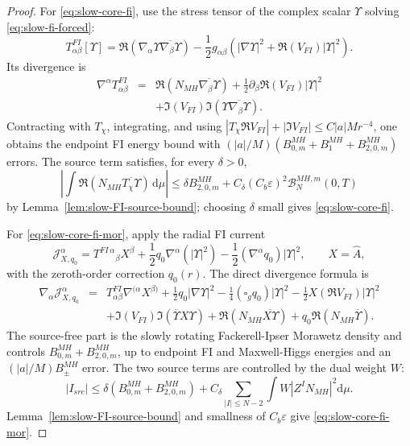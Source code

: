 \documentclass[10pt,a4paper]{amsart}
\newcommand{\dd}{\mathrm{d}}
\begin{document}
\begin{proof}
For \eqref{eq:slow-core-fi}, use the stress tensor of the complex scalar \(\Upsilon\) solving \eqref{eq:slow-fi-forced}:
\begin{equation}
T^{FI}_{\alpha\beta}[\Upsilon]
=\Re(\nabla_\alpha\Upsilon\overline{\nabla_\beta\Upsilon})
-\frac12g_{\alpha\beta}\left(|\nabla\Upsilon|^2+\Re(V_{FI})|\Upsilon|^2\right).
\end{equation}
Its divergence is
\begin{eqnarray}
\nabla^\alpha T^{FI}_{\alpha\beta}
&=&
\Re(N_{MH}\overline{\nabla_\beta\Upsilon})
+\frac12\partial_\beta\Re(V_{FI})|\Upsilon|^2
\nonumber\\
&&+\Im(V_{FI})\Im(\Upsilon\overline{\nabla_\beta\Upsilon}).
\end{eqnarray}
Contracting with \(T_\chi\), integrating, and using \(|T_\chi\Re V_{FI}|+|\Im V_{FI}|\le C|a|Mr^{-4}\), one obtains the endpoint FI energy bound with \((|a|/M)(B_{0,m}^{MH}+B_1^{MH}+B_{2,0,m}^{MH})\) errors.  The source term satisfies, for every \(\delta>0\),
\begin{equation}
\left|\int \Re(N_{MH}\overline{T_\chi\Upsilon})\,\dd\mu\right|
\le \delta B_{2,0,m}^{MH}
+C_\delta(C_b\varepsilon)^2\mathcal B_N^{MH,m}(0,T)
\end{equation}
by Lemma~\ref{lem:slow-FI-source-bound}; choosing \(\delta\) small gives \eqref{eq:slow-core-fi}.

For \eqref{eq:slow-core-fi-mor}, apply the radial FI current
\begin{equation}
\mathcal J^\alpha_{X,q_0}
=T^{FI\,\alpha}{}_{\beta}X^\beta
+\frac12q_0\nabla^\alpha(|\Upsilon|^2)
-\frac12(\nabla^\alpha q_0)|\Upsilon|^2,
\qquad X=\widehat A,
\end{equation}
with the zeroth-order correction \(q_0(r)\).  The direct divergence formula is
\begin{eqnarray}
\nabla_\alpha\mathcal J^\alpha_{X,q_0}
&=&T^{FI}_{\alpha\beta}\nabla^{(\alpha}X^{\beta)}
+\frac12q_0|\nabla\Upsilon|^2
-\frac14(\square_gq_0)|\Upsilon|^2
-\frac12X(\Re V_{FI})|\Upsilon|^2
\nonumber\\
&&+\Im(V_{FI})\Im(\overline\Upsilon X\Upsilon)
+\Re(N_{MH}\overline{X\Upsilon})
+q_0\Re(N_{MH}\overline\Upsilon).
\end{eqnarray}
The source-free part is the slowly rotating Fackerell-Ipser Morawetz density and controls \(B_{0,m}^{MH}+B_{2,0,m}^{MH}\), up to endpoint FI and Maxwell-Higgs energies and an \((|a|/M)B_{\pm}^{MH}\) error.  The two source terms are controlled by the dual weight \(W\):
\begin{equation}
 |I_{src}|
\le \delta(B_{0,m}^{MH}+B_{2,0,m}^{MH})
+C_\delta\sum_{|I|\le N-2}\int W|Z^IN_{MH}|^2\dd\mu.
\end{equation}
Lemma~\ref{lem:slow-FI-source-bound} and smallness of \(C_b\varepsilon\) give \eqref{eq:slow-core-fi-mor}.


\end{proof}
\end{document}
